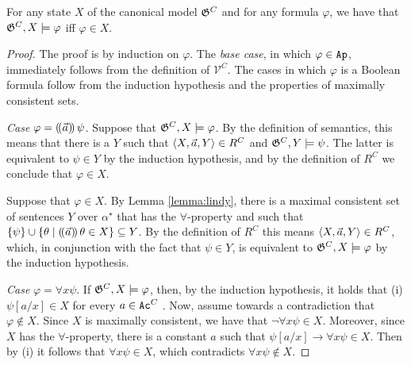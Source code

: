 \documentclass[sigconf,anonymous]{aamas}
\begin{document}
\begin{lemma} 
\label{lemma:truth}
For any state $X$ of the canonical model $\mathfrak{G}^C$  and for any formula $\varphi$, we have that $\mathfrak{G}^C, X \models \varphi$ iff $\varphi \in X$.  
\end{lemma}
\begin{proof}
    The proof is by induction on $\varphi$. The \textit{base case}, in which $\varphi \in \texttt{Ap}$, %
    immediately follows from the definition of $\mathcal{V}^C$. The cases in which $\varphi$ is a Boolean formula follow from the induction hypothesis and the properties of maximally consistent sets.

\textit{Case} $\varphi = (\!( \vec{a} )\!)\, \psi$. Suppose that $\mathfrak{G}^C,X\models \varphi$. By the definition of semantics, this means that there is a $Y$ such that $\langle X,\vec{a},Y \rangle\in R^C$ and $\mathfrak{G}^C,Y\models \psi$. The latter is equivalent to $\psi\in Y$ by the induction hypothesis, and by the definition of $R^C$ we conclude that $\varphi\in X$.

Suppose that $\varphi \in X$. By Lemma \ref{lemma:lindy}, there is a maximal consistent set of sentences $Y$ over $\alpha^\star$ that has the $\forall$-property and such that $\{\psi\}\cup\{\theta\mid (\!( \vec{a} )\!)\,\theta\in X\}\subseteq Y$. By the definition of $R^C$ this means $\langle X,\vec{a},Y \rangle\in R^C$, which, in conjunction with the fact that $\psi \in Y$, is equivalent to $\mathfrak{G}^C,X \models \varphi$ by the induction hypothesis.

\textit{Case} $\varphi = \forall x \psi$. If $\mathfrak{G}^C,X\models \varphi$, then, by the induction hypothesis, it holds that (i) $\psi[a/x]\in X$ for every $a\in \texttt{Ac}^C$ . Now, assume towards a contradiction that $\varphi\not\in X$.  Since $X$ is maximally consistent, we have that $\neg\forall x \psi\in X$. Moreover, since $X$ has the $\forall$-property,  there is a constant $a$ such that $\psi[a/x]\to \forall x \psi \in X$. Then by (i) it follows that %
$\forall x \psi\in X$, which contradicts $\forall x \psi \not \in X$.


\end{proof}
\end{document}
